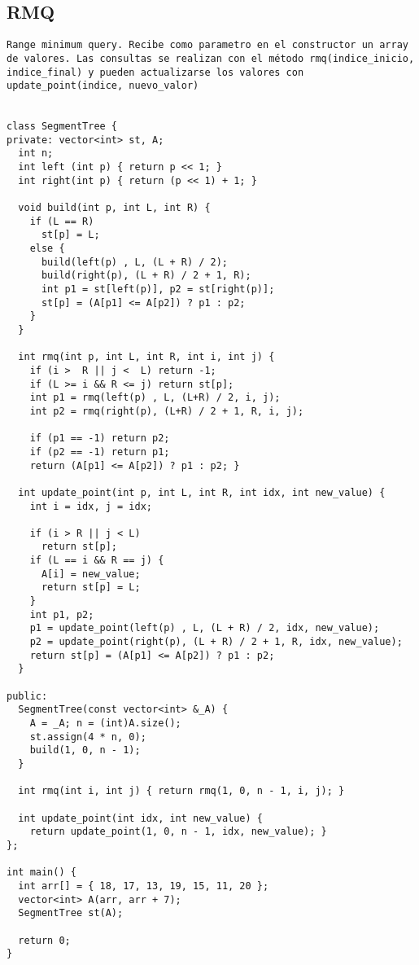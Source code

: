 \documentclass[10pt,letterpaper,twocolumn,twosided]{article}
\begin{document}
\subsection{RMQ}
\begin{lstlisting}
Range minimum query. Recibe como parametro en el constructor un array de valores. Las consultas se realizan con el método rmq(indice_inicio, indice_final) y pueden actualizarse los valores con update_point(indice, nuevo_valor)


class SegmentTree {         
private: vector<int> st, A;            
  int n;
  int left (int p) { return p << 1; }     
  int right(int p) { return (p << 1) + 1; }

  void build(int p, int L, int R) { 
    if (L == R) 
      st[p] = L;
    else { 
      build(left(p) , L, (L + R) / 2);
      build(right(p), (L + R) / 2 + 1, R);
      int p1 = st[left(p)], p2 = st[right(p)];
      st[p] = (A[p1] <= A[p2]) ? p1 : p2;
    } 
  }

  int rmq(int p, int L, int R, int i, int j) { 
    if (i >  R || j <  L) return -1; 
    if (L >= i && R <= j) return st[p]; 
    int p1 = rmq(left(p) , L, (L+R) / 2, i, j);
    int p2 = rmq(right(p), (L+R) / 2 + 1, R, i, j);

    if (p1 == -1) return p2;   
    if (p2 == -1) return p1; 
    return (A[p1] <= A[p2]) ? p1 : p2; } 

  int update_point(int p, int L, int R, int idx, int new_value) {
    int i = idx, j = idx;

    if (i > R || j < L)
      return st[p];
    if (L == i && R == j) {
      A[i] = new_value; 
      return st[p] = L; 
    }
    int p1, p2;
    p1 = update_point(left(p) , L, (L + R) / 2, idx, new_value);
    p2 = update_point(right(p), (L + R) / 2 + 1, R, idx, new_value);
    return st[p] = (A[p1] <= A[p2]) ? p1 : p2;
  }

public:
  SegmentTree(const vector<int> &_A) {
    A = _A; n = (int)A.size();
    st.assign(4 * n, 0);   
    build(1, 0, n - 1);
  }

  int rmq(int i, int j) { return rmq(1, 0, n - 1, i, j); }

  int update_point(int idx, int new_value) {
    return update_point(1, 0, n - 1, idx, new_value); }
};
  
int main() {
  int arr[] = { 18, 17, 13, 19, 15, 11, 20 }; 
  vector<int> A(arr, arr + 7);                  
  SegmentTree st(A);

  return 0;
}
\end{lstlisting}
\end{document}
